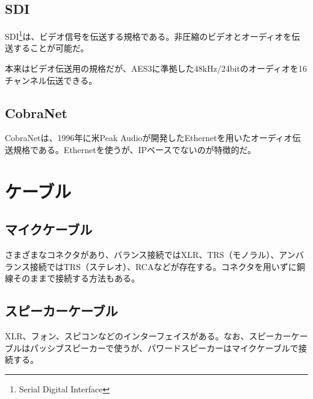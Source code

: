 \subsection{SDI}

SDI\footnote{Serial Digital Interface}は、ビデオ信号を伝送する規格である。非圧縮のビデオとオーディオを伝送することが可能だ。

本来はビデオ伝送用の規格だが、AES3に準拠した48kHz/24bitのオーディオを16チャンネル伝送できる。

\subsection{CobraNet}

CobraNetは、1996年に米Peak Audioが開発したEthernetを用いたオーディオ伝送規格である。Ethernetを使うが、IPベースでないのが特徴的だ\cite{best-practices-in-network-audio}。

\section{ケーブル}

\subsection{マイクケーブル}

さまざまなコネクタがあり、バランス接続ではXLR、TRS（モノラル）、アンバランス接続ではTRS（ステレオ）、RCAなどが存在する。コネクタを用いずに銅線そのままで接続する方法もある。

\subsection{スピーカーケーブル}
XLR、フォン、スピコンなどのインターフェイスがある。なお、スピーカーケーブルはパッシブスピーカーで使うが、パワードスピーカーはマイクケーブルで接続する。




